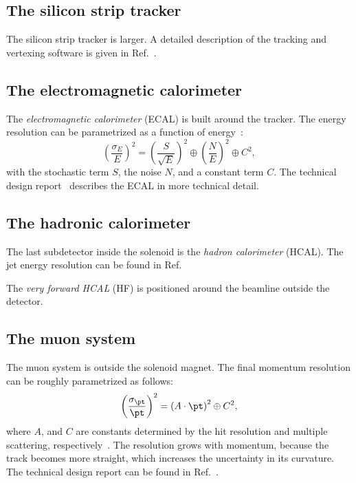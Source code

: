 \subsection{The silicon strip tracker}
The silicon strip tracker is larger.
A detailed description of the tracking and vertexing software is given in Ref.~\cite{CMS_vertex}.

\subsection{The electromagnetic calorimeter}
The \emph{electromagnetic calorimeter} (ECAL) is built around the tracker.
The energy resolution can be parametrized as a function of energy~\cite{CMS}:
\begin{equation}
  \left(\frac{\sigma_E}{E}\right)^2 = \left(\frac{S}{\sqrt{E}}\right)^2 \oplus \left(\frac{N}{E}\right)^2 \oplus C^2,
\end{equation}
with the stochastic term $S$, the noise $N$, and a constant term $C$.
The technical design report~\cite{CMS_ECAL} describes the ECAL in more technical detail.

\subsection{The hadronic calorimeter}
The last subdetector inside the solenoid is the \emph{hadron calorimeter} (HCAL).
The jet energy resolution can be found in Ref.~\cite{CMS-JME-13-004}

The \emph{very forward HCAL} (HF) is positioned around the beamline outside the detector.

\subsection{The muon system}
The muon system is outside the solenoid magnet.
The final momentum resolution can be roughly parametrized as follows:
\begin{equation}
  \left(\frac{\sigma_{\pt}}{\pt}\right)^2 = \left(A\cdot\pt\right)^2 \oplus C^2,
\end{equation}
where $A$, and $C$ are constants determined by the hit resolution and multiple scattering, respectively~\cite{CMS_muon_resolution_thesis}. The resolution grows with momentum, because the track becomes more straight, which increases the uncertainty in its curvature.
The technical design report can be found in Ref.~\cite{CMS_muon}.


